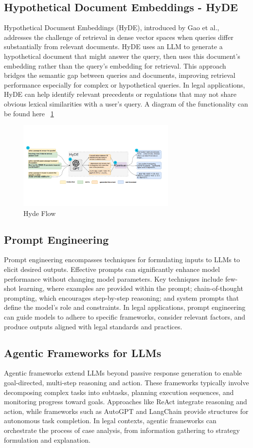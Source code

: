 \subsection{Hypothetical Document Embeddings - HyDE}
Hypothetical Document Embeddings (HyDE), introduced by Gao et al.\cite{gao2022}, 
addresses the challenge of retrieval in dense vector spaces when queries 
differ substantially from relevant documents. HyDE uses an LLM to generate a 
hypothetical document that might answer the query, then uses this document's embedding rather 
than the query's embedding for retrieval. This approach bridges the semantic gap between queries 
and documents, improving retrieval performance especially for complex or hypothetical queries. In legal 
applications, HyDE can help identify relevant precedents or regulations that may not share obvious lexical 
similarities with a user's query\cite{gao2022}. A diagram of the functionality can be found here ~\ref{fig:hyde}
\begin{figure}[htbp]
    \centering
    \includegraphics[width=0.7\textwidth]{figures/HyDE.png}
    \caption{Hyde Flow \cite{gao2022precisezeroshotdenseretrieval}}
    \label{fig:hyde}
\end{figure}
\subsection{Prompt Engineering}
Prompt engineering encompasses techniques for formulating inputs to LLMs to 
elicit desired outputs. Effective prompts can significantly enhance model 
performance without changing model parameters. Key techniques include few-shot 
learning, where examples are provided within the prompt; chain-of-thought prompting, 
which encourages step-by-step reasoning; and system prompts that define the model's role 
and constraints. In legal applications, prompt engineering can guide models to adhere 
to specific frameworks, consider relevant factors, and produce outputs aligned with 
legal standards and practices.
\subsection{Agentic Frameworks for LLMs}
Agentic frameworks extend LLMs beyond passive response generation to enable goal-directed, 
multi-step reasoning and action. These frameworks typically involve decomposing complex 
tasks into subtasks, planning execution sequences, and monitoring progress toward goals. 
Approaches like ReAct integrate reasoning and action, while frameworks such
as AutoGPT and LangChain provide structures for autonomous task completion. 
In legal contexts, agentic frameworks can orchestrate the process of case analysis, 
from information gathering to strategy formulation and explanation.
